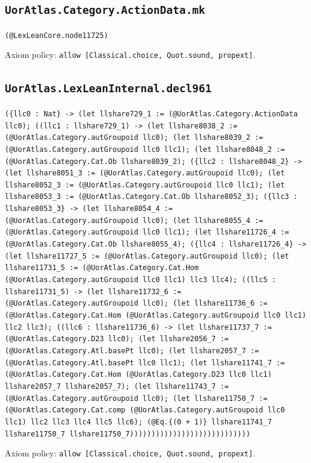 \documentclass[11pt]{article}
\begin{document}
\subsection*{\texttt{UorAtlas.Category.ActionData.mk}}
\noindent\texttt{(@LexLeanCore.node11725)}\par
\noindent Axiom policy: \texttt{allow [Classical.choice, Quot.sound, propext]}.\par
\subsection*{\texttt{UorAtlas.LexLeanInternal.decl961}}
\noindent\texttt{(\{llc0 : Nat\} -> (let llshare729\_1 := (@UorAtlas.Category.ActionData llc0); ((llc1 : llshare729\_1) -> (let llshare8038\_2 := (@UorAtlas.Category.autGroupoid llc0); (let llshare8039\_2 := (@UorAtlas.Category.autGroupoid llc0 llc1); (let llshare8048\_2 := (@UorAtlas.Category.Cat.Ob llshare8039\_2); (\{llc2 : llshare8048\_2\} -> (let llshare8051\_3 := (@UorAtlas.Category.autGroupoid llc0); (let llshare8052\_3 := (@UorAtlas.Category.autGroupoid llc0 llc1); (let llshare8053\_3 := (@UorAtlas.Category.Cat.Ob llshare8052\_3); (\{llc3 : llshare8053\_3\} -> (let llshare8054\_4 := (@UorAtlas.Category.autGroupoid llc0); (let llshare8055\_4 := (@UorAtlas.Category.autGroupoid llc0 llc1); (let llshare11726\_4 := (@UorAtlas.Category.Cat.Ob llshare8055\_4); (\{llc4 : llshare11726\_4\} -> (let llshare11727\_5 := (@UorAtlas.Category.autGroupoid llc0); (let llshare11731\_5 := (@UorAtlas.Category.Cat.Hom (@UorAtlas.Category.autGroupoid llc0 llc1) llc3 llc4); ((llc5 : llshare11731\_5) -> (let llshare11732\_6 := (@UorAtlas.Category.autGroupoid llc0); (let llshare11736\_6 := (@UorAtlas.Category.Cat.Hom (@UorAtlas.Category.autGroupoid llc0 llc1) llc2 llc3); ((llc6 : llshare11736\_6) -> (let llshare11737\_7 := (@UorAtlas.Category.D23 llc0); (let llshare2056\_7 := (@UorAtlas.Category.Atl.basePt llc0); (let llshare2057\_7 := (@UorAtlas.Category.Atl.basePt llc0 llc1); (let llshare11741\_7 := (@UorAtlas.Category.Cat.Hom (@UorAtlas.Category.D23 llc0 llc1) llshare2057\_7 llshare2057\_7); (let llshare11743\_7 := (@UorAtlas.Category.autGroupoid llc0); (let llshare11750\_7 := (@UorAtlas.Category.Cat.comp (@UorAtlas.Category.autGroupoid llc0 llc1) llc2 llc3 llc4 llc5 llc6); (@Eq.\{(0 + 1)\} llshare11741\_7 llshare11750\_7 llshare11750\_7))))))))))))))))))))))))))))}\par
\noindent Axiom policy: \texttt{allow [Classical.choice, Quot.sound, propext]}.\par
\end{document}
